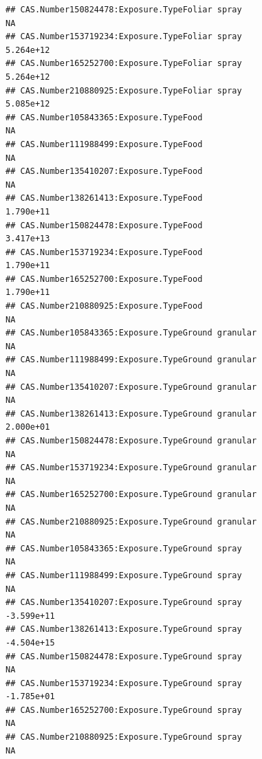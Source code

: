 \documentclass[
  12pt,
]{article}
\begin{document}
\begin{verbatim}
## CAS.Number150824478:Exposure.TypeFoliar spray                                           NA
## CAS.Number153719234:Exposure.TypeFoliar spray                                    5.264e+12
## CAS.Number165252700:Exposure.TypeFoliar spray                                    5.264e+12
## CAS.Number210880925:Exposure.TypeFoliar spray                                    5.085e+12
## CAS.Number105843365:Exposure.TypeFood                                                   NA
## CAS.Number111988499:Exposure.TypeFood                                                   NA
## CAS.Number135410207:Exposure.TypeFood                                                   NA
## CAS.Number138261413:Exposure.TypeFood                                            1.790e+11
## CAS.Number150824478:Exposure.TypeFood                                            3.417e+13
## CAS.Number153719234:Exposure.TypeFood                                            1.790e+11
## CAS.Number165252700:Exposure.TypeFood                                            1.790e+11
## CAS.Number210880925:Exposure.TypeFood                                                   NA
## CAS.Number105843365:Exposure.TypeGround granular                                        NA
## CAS.Number111988499:Exposure.TypeGround granular                                        NA
## CAS.Number135410207:Exposure.TypeGround granular                                        NA
## CAS.Number138261413:Exposure.TypeGround granular                                 2.000e+01
## CAS.Number150824478:Exposure.TypeGround granular                                        NA
## CAS.Number153719234:Exposure.TypeGround granular                                        NA
## CAS.Number165252700:Exposure.TypeGround granular                                        NA
## CAS.Number210880925:Exposure.TypeGround granular                                        NA
## CAS.Number105843365:Exposure.TypeGround spray                                           NA
## CAS.Number111988499:Exposure.TypeGround spray                                           NA
## CAS.Number135410207:Exposure.TypeGround spray                                   -3.599e+11
## CAS.Number138261413:Exposure.TypeGround spray                                   -4.504e+15
## CAS.Number150824478:Exposure.TypeGround spray                                           NA
## CAS.Number153719234:Exposure.TypeGround spray                                   -1.785e+01
## CAS.Number165252700:Exposure.TypeGround spray                                           NA
## CAS.Number210880925:Exposure.TypeGround spray                                           NA

\end{verbatim}
\end{document}
